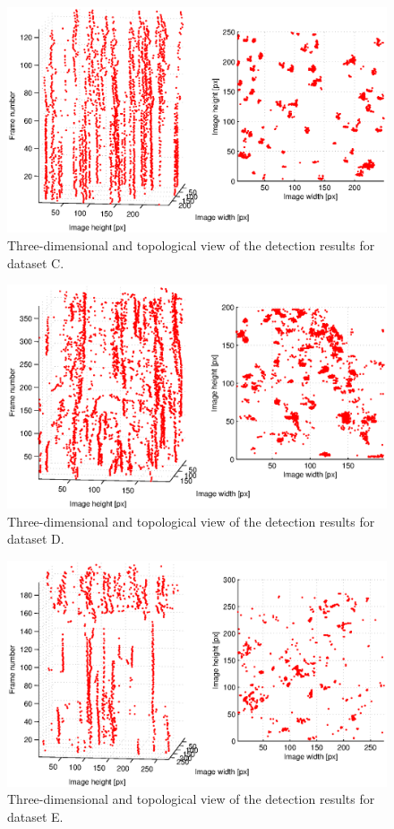 \begin{figure}
	\includegraphics[width=\textwidth]{images/fig_results_detector_sequences_3}
	\caption{Three-dimensional and topological view of the detection results for dataset C.}
	\label{fig:results_detector_sequences_3}
\end{figure}

\begin{figure}
	\includegraphics[width=\textwidth]{images/fig_results_detector_sequences_4}
	\caption{Three-dimensional and topological view of the detection results for dataset D.}
	\label{fig:results_detector_sequences_4}
\end{figure}
\begin{figure}
	\includegraphics[width=\textwidth]{images/fig_results_detector_sequences_5}
	\caption{Three-dimensional and topological view of the detection results for dataset E.}
	\label{fig:results_detector_sequences_5}
\end{figure}			